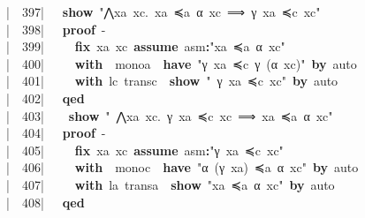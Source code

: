 \documentclass{article}
\newcommand{\syntaxKEYWORDA}[1]{\textcolor[rgb]{0.0,0.4,0.6}{\textbf{#1}}}
\newcommand{\syntaxKEYWORDC}[1]{\textcolor[rgb]{0.0,0.6,1.0}{\textbf{#1}}}
\newcommand{\syntaxLITERALA}[1]{\textcolor[rgb]{1.0,0.0,0.8}{#1}}
\newcommand{\syntaxOPERATOR}[1]{\textcolor[rgb]{0.0,0.0,0.0}{\textbf{#1}}}
\newcommand{\syntaxKEYWORDA}[1]{\textcolor[rgb]{0.0,0.4,0.6}{\textbf{#1}}}
\newcommand{\syntaxKEYWORDC}[1]{\textcolor[rgb]{0.0,0.6,1.0}{\textbf{#1}}}
\newcommand{\syntaxLITERALA}[1]{\textcolor[rgb]{1.0,0.0,0.8}{#1}}
\newcommand{\syntaxOPERATOR}[1]{\textcolor[rgb]{0.0,0.0,0.0}{\textbf{#1}}}
\newcommand{\syntaxKEYWORDA}[1]{\textcolor[rgb]{0.0,0.4,0.6}{\textbf{#1}}}
\newcommand{\syntaxKEYWORDC}[1]{\textcolor[rgb]{0.0,0.6,1.0}{\textbf{#1}}}
\newcommand{\syntaxLITERALA}[1]{\textcolor[rgb]{1.0,0.0,0.8}{#1}}
\newcommand{\syntaxOPERATOR}[1]{\textcolor[rgb]{0.0,0.0,0.0}{\textbf{#1}}}
\newcommand{\syntaxKEYWORDA}[1]{\textcolor[rgb]{0.0,0.4,0.6}{#1}}
\newcommand{\syntaxKEYWORDC}[1]{\textcolor[rgb]{0.0,0.6,1.0}{#1}}
\newcommand{\syntaxLITERALA}[1]{\textcolor[rgb]{1.0,0.0,0.8}{\textbf{#1}}}
\newcommand{\syntaxOPERATOR}[1]{\textcolor[rgb]{0.0,0.0,0.0}{#1}}
\newcommand{\syntaxKEYWORDA}[1]{\textcolor[rgb]{0.0,0.4,0.6}{\textbf{#1}}}
\newcommand{\syntaxKEYWORDC}[1]{\textcolor[rgb]{0.0,0.6,1.0}{\textbf{#1}}}
\newcommand{\syntaxLITERALA}[1]{\textcolor[rgb]{1.0,0.0,0.8}{#1}}
\newcommand{\syntaxOPERATOR}[1]{\textcolor[rgb]{0.0,0.0,0.0}{\textbf{#1}}}
\newcommand{\syntaxKEYWORDA}[1]{\textcolor[rgb]{0.0,0.4,0.6}{\textbf{#1}}}
\newcommand{\syntaxKEYWORDC}[1]{\textcolor[rgb]{0.0,0.6,1.0}{\textbf{#1}}}
\newcommand{\syntaxLITERALA}[1]{\textcolor[rgb]{1.0,0.0,0.8}{#1}}
\newcommand{\syntaxOPERATOR}[1]{\textcolor[rgb]{0.0,0.0,0.0}{\textbf{#1}}}
\newcommand{\syntaxKEYWORDA}[1]{\textcolor[rgb]{0.0,0.0,0.0}{#1}}
\newcommand{\syntaxKEYWORDC}[1]{\textcolor[rgb]{0.0,0.0,0.0}{#1}}
\newcommand{\gutter}[1]{\textcolor[rgb]{0,0,0}{{|}#1}}
\newcommand{\gutterH}[1]{\textcolor[rgb]{1,0,0}{{|}#1}}
\begin{document}
\gutter{\ \ 397{|}\ }{\ }{\ }\syntaxKEYWORDC{show}{\ }\syntaxLITERALA{"⋀xa{\ }xc.{\ }xa{\ }≼a{\ }α{\ }xc{\ }⟹{\ }γ{\ }xa{\ }≼c{\ }xc"}\hspace*{\fill}\\
\gutter{\ \ 398{|}\ }{\ }{\ }\syntaxKEYWORDA{proof}{\ }{-}\hspace*{\fill}\\
\gutter{\ \ 399{|}\ }{\ }{\ }{\ }{\ }\syntaxKEYWORDC{fix}{\ }xa{\ }xc{\ }\syntaxKEYWORDC{assume}{\ }asm\syntaxOPERATOR{:}\syntaxLITERALA{"xa{\ }≼a{\ }α{\ }xc"}{\ }{\ }\hspace*{\fill}\\
\gutterH{\ \ 400{|}\ }{\ }{\ }{\ }{\ }\syntaxKEYWORDA{with}{\ }{\ }monoa{\ }{\ }\syntaxKEYWORDA{have}{\ }\syntaxLITERALA{"γ{\ }xa{\ }≼c{\ }γ{\ }(α{\ }xc)"}{\ }\syntaxKEYWORDA{by}{\ }auto\hspace*{\fill}\\
\gutter{\ \ 401{|}\ }{\ }{\ }{\ }{\ }\syntaxKEYWORDA{with}{\ }lc{\ }transc{\ }{\ }\syntaxKEYWORDC{show}{\ }\syntaxLITERALA{"{\ }γ{\ }xa{\ }≼c{\ }xc"}{\ }\syntaxKEYWORDA{by}{\ }auto\hspace*{\fill}\\
\gutter{\ \ 402{|}\ }{\ }{\ }\syntaxKEYWORDA{qed}\hspace*{\fill}\\
\gutter{\ \ 403{|}\ }{\ }{\ }{\ }\syntaxKEYWORDC{show}{\ }\syntaxLITERALA{"{\ }⋀xa{\ }xc.{\ }γ{\ }xa{\ }≼c{\ }xc{\ }⟹{\ }xa{\ }≼a{\ }α{\ }xc"}\hspace*{\fill}\\
\gutter{\ \ 404{|}\ }{\ }{\ }\syntaxKEYWORDA{proof}{\ }{-}\hspace*{\fill}\\
\gutterH{\ \ 405{|}\ }{\ }{\ }{\ }{\ }\syntaxKEYWORDC{fix}{\ }xa{\ }xc{\ }\syntaxKEYWORDC{assume}{\ }asm\syntaxOPERATOR{:}\syntaxLITERALA{"γ{\ }xa{\ }≼c{\ }xc"}{\ }{\ }\hspace*{\fill}\\
\gutter{\ \ 406{|}\ }{\ }{\ }{\ }{\ }\syntaxKEYWORDA{with}{\ }{\ }monoc{\ }{\ }\syntaxKEYWORDA{have}{\ }\syntaxLITERALA{"α{\ }(γ{\ }xa){\ }≼a{\ }α{\ }xc"}{\ }\syntaxKEYWORDA{by}{\ }auto\hspace*{\fill}\\
\gutter{\ \ 407{|}\ }{\ }{\ }{\ }{\ }\syntaxKEYWORDA{with}{\ }la{\ }transa{\ }{\ }\syntaxKEYWORDC{show}{\ }\syntaxLITERALA{"xa{\ }≼a{\ }α{\ }xc"}{\ }\syntaxKEYWORDA{by}{\ }auto\hspace*{\fill}\\
\gutter{\ \ 408{|}\ }{\ }{\ }\syntaxKEYWORDA{qed}\hspace*{\fill}\\
\end{document}
